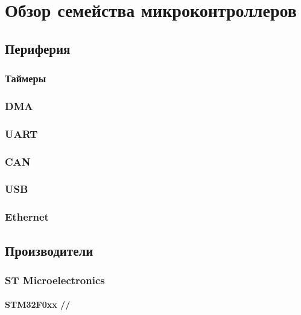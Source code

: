



\maketitle
\tableofcontents
\listoflab

\part{Обзор семейства микроконтроллеров \cx}



\section{\cx}
\chapter{Периферия}
\section{Таймеры}
\section{DMA}
\section{UART}
\section{CAN}
\section{USB}
\section{Ethernet}
\chapter{Производители}
\section{ST Microelectronics}
\subsection{STM32F0xx //}

